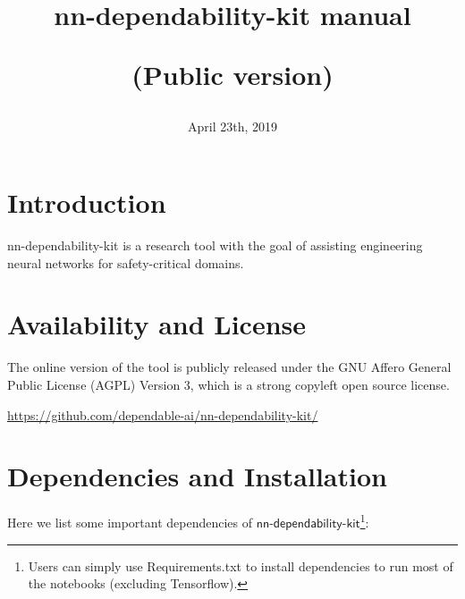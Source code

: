 \documentclass{article}
\title{\textsf{nn-dependability-kit} manual \\ \begin{large}(Public version)\end{large}}
\date{April 23th, 2019}
\begin{document}
\maketitle

\section{Introduction}

\textsf{nn-dependability-kit} is a research tool with the goal of assisting engineering neural networks for safety-critical domains. 


\section{Availability and License}

The online version of the tool is publicly released under the GNU Affero General Public License (AGPL) Version 3, which is a strong copyleft open source license. 

\vspace{5mm}

\url{https://github.com/dependable-ai/nn-dependability-kit/}



\section{Dependencies and Installation}

Here we list some important dependencies of $\textsf{nn-dependability-kit}$\footnote{Users can simply use Requirements.txt to install dependencies to run most of the notebooks (excluding Tensorflow).}:
\end{document}
